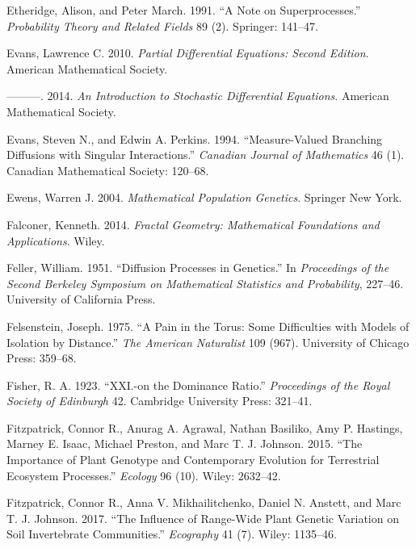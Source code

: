 \documentclass[]{article}
\begin{document}
\leavevmode\hypertarget{ref-Etheridge1991}{}%
Etheridge, Alison, and Peter March. 1991. ``A Note on Superprocesses.''
\emph{Probability Theory and Related Fields} 89 (2). Springer: 141--47.

\leavevmode\hypertarget{ref-lawrenceevans2010}{}%
Evans, Lawrence C. 2010. \emph{Partial Differential Equations: Second
Edition}. American Mathematical Society.

\leavevmode\hypertarget{ref-9781470410544}{}%
---------. 2014. \emph{An Introduction to Stochastic Differential
Equations}. American Mathematical Society.

\leavevmode\hypertarget{ref-Evans1994}{}%
Evans, Steven N., and Edwin A. Perkins. 1994. ``Measure-Valued Branching
Diffusions with Singular Interactions.'' \emph{Canadian Journal of
Mathematics} 46 (1). Canadian Mathematical Society: 120--68.

\leavevmode\hypertarget{ref-Ewens2004}{}%
Ewens, Warren J. 2004. \emph{Mathematical Population Genetics}. Springer
New York.

\leavevmode\hypertarget{ref-kennethfalconer2014}{}%
Falconer, Kenneth. 2014. \emph{Fractal Geometry: Mathematical
Foundations and Applications}. Wiley.

\leavevmode\hypertarget{ref-feller1951}{}%
Feller, William. 1951. ``Diffusion Processes in Genetics.'' In
\emph{Proceedings of the Second Berkeley Symposium on Mathematical
Statistics and Probability}, 227--46. University of California Press.

\leavevmode\hypertarget{ref-Felsenstein1975}{}%
Felsenstein, Joseph. 1975. ``A Pain in the Torus: Some Difficulties with
Models of Isolation by Distance.'' \emph{The American Naturalist} 109
(967). University of Chicago Press: 359--68.

\leavevmode\hypertarget{ref-Fisher1923}{}%
Fisher, R. A. 1923. ``XXI.-on the Dominance Ratio.'' \emph{Proceedings
of the Royal Society of Edinburgh} 42. Cambridge University Press:
321--41.

\leavevmode\hypertarget{ref-Fitzpatrick2015}{}%
Fitzpatrick, Connor R., Anurag A. Agrawal, Nathan Basiliko, Amy P.
Hastings, Marney E. Isaac, Michael Preston, and Marc T. J. Johnson.
2015. ``The Importance of Plant Genotype and Contemporary Evolution for
Terrestrial Ecosystem Processes.'' \emph{Ecology} 96 (10). Wiley:
2632--42.

\leavevmode\hypertarget{ref-Fitzpatrick2017}{}%
Fitzpatrick, Connor R., Anna V. Mikhailitchenko, Daniel N. Anstett, and
Marc T. J. Johnson. 2017. ``The Influence of Range-Wide Plant Genetic
Variation on Soil Invertebrate Communities.'' \emph{Ecography} 41 (7).
Wiley: 1135--46.
\end{document}
